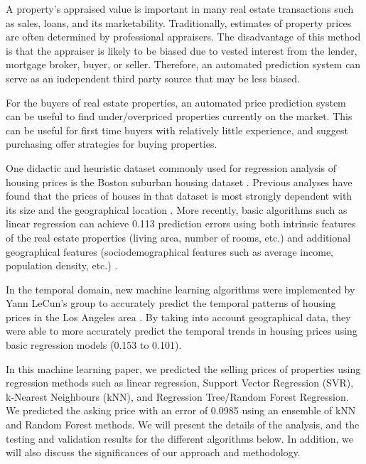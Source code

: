 \documentclass[conference]{IEEEtran}
\begin{document}
A property's appraised value is important in many real estate transactions such as sales, loans, and its marketability. Traditionally, estimates of property prices are often determined by professional appraisers. The disadvantage of this method is that the appraiser is likely to be biased due to vested interest from the lender, mortgage broker, buyer, or seller. Therefore, an automated prediction system can serve as an independent third party source that may be less biased.

For the buyers of real estate properties, an automated price prediction system can be useful to find under/overpriced properties currently on the market. This can be useful for first time buyers with relatively little experience, and suggest purchasing offer strategies for buying properties.

One didactic and heuristic dataset commonly used for regression analysis of housing prices is the Boston suburban housing dataset \cite{RePEc:eee:jeeman:v:5:y:1978:i:1:p:81-102}. Previous analyses have found that the prices of houses in that dataset is most strongly dependent with its size and the geographical location \cite{belkuhwel80, Quinlan93combininginstance-based}. More recently, basic algorithms such as linear regression can achieve 0.113 prediction errors using both intrinsic features of the real estate properties (living area, number of rooms, etc.) and additional geographical features (sociodemographical features such as average income, population density, etc.) \cite{RePEc:jre:issued:v:32:n:2:2010:p:139-160, SpatialDependence}.

In the temporal domain, new machine learning algorithms were implemented by Yann LeCun's group to accurately predict the temporal patterns of housing prices in the Los Angeles area \cite{Caplin08machinelearning}. By taking into account geographical data, they were able to more accurately predict the temporal trends in housing prices using basic regression models (0.153 to 0.101).

In this machine learning paper, we predicted the selling prices of properties using regression methods such as linear regression, Support Vector Regression (SVR), k-Nearest Neighbours (kNN), and Regression Tree/Random Forest Regression. We predicted the asking price with an error of 0.0985 using an ensemble of kNN and Random Forest methods. We will present the details of the analysis, and the testing and validation results for the different algorithms below. In addition, we will also discuss the significances of our approach and methodology.
\end{document}
